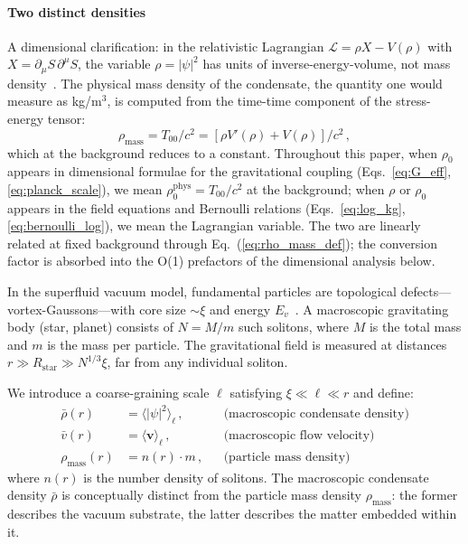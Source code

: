 \documentclass[12pt, a4paper]{article}
\newcommand{\rhob}{\bar{\rho}}
\newcommand{\vb}{\bar{v}}
\begin{document}
\paragraph{Two distinct densities}
A dimensional clarification: in the relativistic Lagrangian $\mathcal{L} = \rho X - V(\rho)$ with $X = \partial_\mu S\,\partial^\mu S$, the variable $\rho = |\psi|^2$ has units of inverse-energy-volume, not mass density~\cite{kulangiev_2026}. The physical mass density of the condensate, the quantity one would measure as kg/m$^3$, is computed from the time-time component of the stress-energy tensor:
\begin{equation}
    \rho_{\mathrm{mass}} = T_{00}/c^2 = [\rho V'(\rho) + V(\rho)]/c^2\,,
\label{eq:rho_mass_def}
\end{equation}
which at the background reduces to a constant. Throughout this paper, when $\rho_0$ appears in dimensional formulae for the gravitational coupling (Eqs.~\ref{eq:G_eff}, \ref{eq:planck_scale}), we mean $\rho_0^{\mathrm{phys}} = T_{00}/c^2$ at the background; when $\rho$ or $\rho_0$ appears in the field equations and Bernoulli relations (Eqs.~\ref{eq:log_kg}, \ref{eq:bernoulli_log}), we mean the Lagrangian variable. The two are linearly related at fixed background through Eq.~(\ref{eq:rho_mass_def}); the conversion factor is absorbed into the O(1) prefactors of the dimensional analysis below.

In the superfluid vacuum model, fundamental particles are topological defects---vortex-Gaussons---with core size $\sim\xi$ and energy $E_v$~\cite{bialynicki_birula_1979,avdeenkov_2011}. A macroscopic gravitating body (star, planet) consists of $N = M/m$ such solitons, where $M$ is the total mass and $m$ is the mass per particle. The gravitational field is measured at distances $r \gg R_{\mathrm{star}} \gg N^{1/3}\xi$, far from any individual soliton.

We introduce a coarse-graining scale $\ell$ satisfying $\xi \ll \ell \ll r$ and define:
\begin{align}
    \rhob(r) &= \langle|\psi|^2\rangle_\ell\,,
    & &\text{(macroscopic condensate density)}\\
    \vb(r) &= \langle\mathbf{v}\rangle_\ell\,,
    & &\text{(macroscopic flow velocity)}\\
    \rho_{\mathrm{mass}}(r) &= n(r)\cdot m\,,
    & &\text{(particle mass density)}
\end{align}
where $n(r)$ is the number density of solitons. The macroscopic condensate density $\rhob$ is conceptually distinct from the particle mass density $\rho_{\mathrm{mass}}$: the former describes the vacuum substrate, the latter describes the matter embedded within it.
\end{document}
